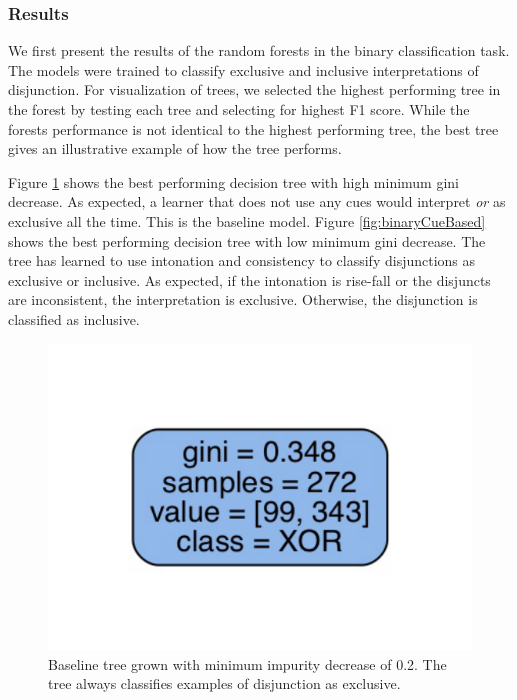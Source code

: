 \documentclass[,man,floatsintext]{apa6}
\begin{document}
\hypertarget{results-1}{%
\subsubsection{Results}\label{results-1}}

We first present the results of the random forests in the binary classification task. The models were trained to classify exclusive and inclusive interpretations of disjunction. For visualization of trees, we selected the highest performing tree in the forest by testing each tree and selecting for highest F1 score. While the forests performance is not identical to the highest performing tree, the best tree gives an illustrative example of how the tree performs.

Figure \ref{fig:binaryBaseline} shows the best performing decision tree with high minimum gini decrease. As expected, a learner that does not use any cues would interpret \emph{or} as exclusive all the time. This is the baseline model. Figure \ref{fig:binaryCueBased} shows the best performing decision tree with low minimum gini decrease. The tree has learned to use intonation and consistency to classify disjunctions as exclusive or inclusive. As expected, if the intonation is rise-fall or the disjuncts are inconsistent, the interpretation is exclusive. Otherwise, the disjunction is classified as inclusive.

\begin{figure}
\centering
\includegraphics{figs/binaryBaseline-1.pdf}
\caption{\label{fig:binaryBaseline}Baseline tree grown with minimum impurity decrease of 0.2. The tree always classifies examples of disjunction as exclusive.}
\end{figure}
\end{document}

